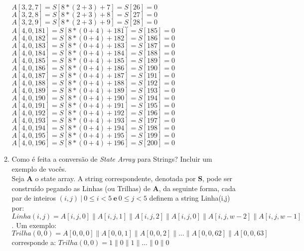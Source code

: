 \documentclass[12pt, a4paper]{article}
\begin{document}
\begin{enumerate}
\begin{enumerate}
$A[ 3 , 2 , 7 ]=S[8*( 2 + 3 )+ 7 ]=S[ 26 ]= 0 $\\
$A[ 3 , 2 , 8 ]=S[8*( 2 + 3 )+ 8 ]=S[ 27 ]= 0 $\\
$A[ 3 , 2 , 9 ]=S[8*( 2 + 3 )+ 9 ]=S[ 28 ]= 0 $\\
$$\ldots$$
$A[ 4 , 0 , 181 ]=S[8*( 0 + 4 )+ 181 ]=S[ 185 ]= 0 $\\
$A[ 4 , 0 , 182 ]=S[8*( 0 + 4 )+ 182 ]=S[ 186 ]= 0 $\\
$A[ 4 , 0 , 183 ]=S[8*( 0 + 4 )+ 183 ]=S[ 187 ]= 0 $\\
$A[ 4 , 0 , 184 ]=S[8*( 0 + 4 )+ 184 ]=S[ 188 ]= 0 $\\
$A[ 4 , 0 , 185 ]=S[8*( 0 + 4 )+ 185 ]=S[ 189 ]= 0 $\\
$A[ 4 , 0 , 186 ]=S[8*( 0 + 4 )+ 186 ]=S[ 190 ]= 0 $\\
$A[ 4 , 0 , 187 ]=S[8*( 0 + 4 )+ 187 ]=S[ 191 ]= 0 $\\
$A[ 4 , 0 , 188 ]=S[8*( 0 + 4 )+ 188 ]=S[ 192 ]= 0 $\\
$A[ 4 , 0 , 189 ]=S[8*( 0 + 4 )+ 189 ]=S[ 193 ]= 0 $\\
$A[ 4 , 0 , 190 ]=S[8*( 0 + 4 )+ 190 ]=S[ 194 ]= 0 $\\
$A[ 4 , 0 , 191 ]=S[8*( 0 + 4 )+ 191 ]=S[ 195 ]= 0 $\\
$A[ 4 , 0 , 192 ]=S[8*( 0 + 4 )+ 192 ]=S[ 196 ]= 0 $\\
$A[ 4 , 0 , 193 ]=S[8*( 0 + 4 )+ 193 ]=S[ 197 ]= 0 $\\
$A[ 4 , 0 , 194 ]=S[8*( 0 + 4 )+ 194 ]=S[ 198 ]= 0 $\\
$A[ 4 , 0 , 195 ]=S[8*( 0 + 4 )+ 195 ]=S[ 199 ]= 0 $\\
$A[ 4 , 0 , 196 ]=S[8*( 0 + 4 )+ 196 ]=S[ 200 ]= 0 $\\


\item Como é feita a conversão de \textit{State Array} para Strings? Incluir um
exemplo de vocês.\\

Seja \textbf{A} o state array. A string correspondente, denotada por \textbf{S},
pode ser construído pegando as Linhas (ou Trilhas) de \textbf{A}, da seguinte
forma, cada par de inteiros $(i,j)\ |\ 0 \le i < 5\ \textbf{e}\ 0 \le j < 5$
definem a string Linha(i,j) por: $Linha(i,j)=A[i,j,0] \parallel A[i,j,1]
\parallel A[i,j,2] \parallel A[i,j,0] \parallel A[i,j,w-2] \parallel
A[i,j,w-1]$. Um exemplo:\\

$Trilha (0, 0) = A[0, 0, 0] \parallel A[0, 0, 1] \parallel A[0, 0, 2] \parallel
\ldots \parallel A[0, 0, 62] \parallel A[0, 0, 63]$ corresponde a: $Trilha (0,
0) = 1 \parallel 0 \parallel 1 \parallel \ldots \parallel 0 \parallel 0$\\


\end{enumerate}
\end{enumerate}
\end{document}
